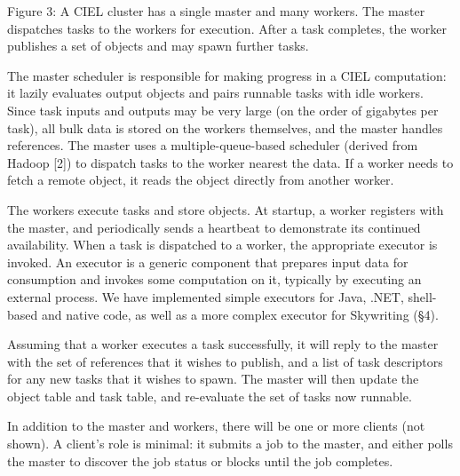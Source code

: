 \documentclass[
]{article}
\begin{document}
Figure 3: A CIEL cluster has a single master and many workers. The
master dispatches tasks to the workers for execution. After a task
completes, the worker publishes a set of objects and may spawn further
tasks.

The master scheduler is responsible for making progress in a CIEL
computation: it lazily evaluates output objects and pairs runnable tasks
with idle workers. Since task inputs and outputs may be very large (on
the order of gigabytes per task), all bulk data is stored on the workers
themselves, and the master handles references. The master uses a
multiple-queue-based scheduler (derived from Hadoop {[}2{]}) to dispatch
tasks to the worker nearest the data. If a worker needs to fetch a
remote object, it reads the object directly from another worker.

The workers execute tasks and store objects. At startup, a worker
registers with the master, and periodically sends a heartbeat to
demonstrate its continued availability. When a task is dispatched to a
worker, the appropriate executor is invoked. An executor is a generic
component that prepares input data for consumption and invokes some
computation on it, typically by executing an external process. We have
implemented simple executors for Java, .NET, shell-based and native
code, as well as a more complex executor for Skywriting (§4).

Assuming that a worker executes a task successfully, it will reply to
the master with the set of references that it wishes to publish, and a
list of task descriptors for any new tasks that it wishes to spawn. The
master will then update the object table and task table, and re-evaluate
the set of tasks now runnable.

In addition to the master and workers, there will be one or more clients
(not shown). A client's role is minimal: it submits a job to the master,
and either polls the master to discover the job status or blocks until
the job completes.
\end{document}
